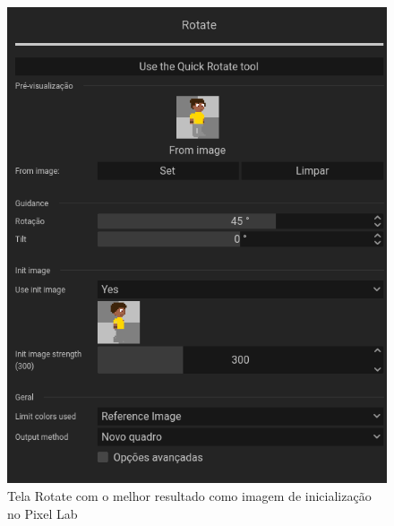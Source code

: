\begin{figure}[htbp]
    \centering
    \caption{\small Tela Rotate com o melhor resultado como imagem de inicialização no Pixel Lab}
    \label{fig:pixelLabRotInit}
    \includegraphics[width=0.7\linewidth]{figs/pixelLab/dia2/menu_fix3_init1.PNG}
\end{figure}

